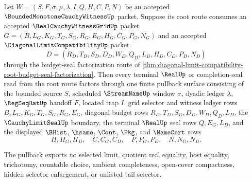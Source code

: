 \begin{theorem}
\label{thm:bounded-monotone-cauchy-witness-diagonal-limit-compatibility-pullback}
Let $W=(S,F,\sigma,\mu,\lambda,I,Q,H,C,P,N)$ be an accepted $\BoundedMonotoneCauchyWitnessUp$ packet. Suppose its root route consumes an accepted $\RealCauchyWitnessGridUp$ packet $G=(B,L_G,K_G,T_G,S_G,R_G,E_G,H_G,C_G,P_G,N_G)$ and an accepted $\DiagonalLimitCompatibilityUp$ packet
$$
D=(R_D,T_D,S_D,D_D,W_D,Q_D,L_D,H_D,C_D,P_D,N_D)
$$
through the budget-seal factorization route of \autoref{thm:diagonal-limit-compatibility-root-budget-seal-factorization}. Then every terminal $\RealUp$ or completion-seal read from the root route factors through one finite pullback surface consisting of the bounded source $S$, scheduled $\StreamNameUp$ window $\sigma$, dyadic ledger $\lambda$, $\RegSeqRatUp$ handoff $F$, located trap $I$, grid selector and witness ledger rows $B,L_G,K_G,T_G,S_G,R_G,E_G$, diagonal budget rows $R_D,T_D,S_D,D_D,W_D,Q_D,L_D$, the $\CauchyLimitSealUp$ boundary, the terminal $\RealUp$ seal rows $Q,E_G,L_D$, and the displayed $\BHist$, $\hsame$, $\Cont$, $\Pkg$, and $\NameCert$ rows
$$
H,H_G,H_D,\quad C,C_G,C_D,\quad P,P_G,P_D,\quad N,N_G,N_D.
$$

The pullback exports no selected limit, quotient real equality, host equality, trichotomy, countable choice, ambient completeness, open-cover compactness, hidden selector enlargement, or unlisted tail selector.
\end{theorem}
